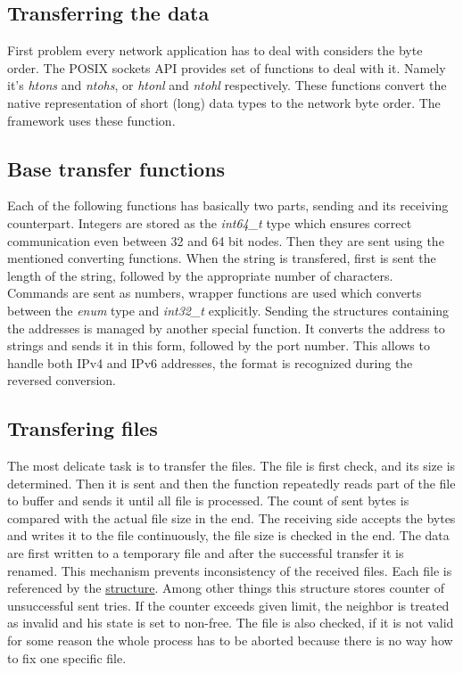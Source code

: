 \subsection{Transferring the data}\label{transferring-the-data}

First problem every network application has to deal with considers the
byte order. The POSIX sockets API provides set of functions to deal with
it. Namely it's \textit{htons} and \textit{ntohs}, or \textit{htonl} and
\textit{ntohl} respectively. These functions convert the native
representation of short (long) data types to the network byte order. The
framework uses these function.

\subsection*{Base transfer functions}

Each of the following functions has basically two parts, sending and its
receiving counterpart. Integers are stored as the \textit{int64\_t} type
which ensures correct communication even between 32 and 64 bit nodes.
Then they are sent using the mentioned converting functions. When the
string is transfered, first is sent the length of the string, followed
by the appropriate number of characters. Commands are sent as numbers,
wrapper functions are used which converts between the \textit{enum} type
and \textit{int32\_t} explicitly. Sending the structures containing the
addresses is managed by another special function. It converts the
address to strings and sends it in this form, followed by the port
number. This allows to handle both IPv4 and IPv6 addresses, the format
is recognized during the reversed conversion.

\subsection*{Transfering files}

The most delicate task is to transfer the files. The file is first
check, and its size is determined. Then it is sent and then the function
repeatedly reads part of the file to buffer and sends it until all file
is processed. The count of sent bytes is compared with the actual file
size in the end. The receiving side accepts the bytes and writes it to
the file continuously, the file size is checked in the end. The data are
first written to a temporary file and after the successful transfer it
is renamed. This mechanism prevents inconsistency of the received files.
Each file is referenced by the
\hyperref[the-transferinfo-structure]{structure}. Among other things
this structure stores counter of unsuccessful sent tries. If the counter
exceeds given limit, the neighbor is treated as invalid and his state is
set to non-free. The file is also checked, if it is not valid for some
reason the whole process has to be aborted because there is no way how
to fix one specific file.

